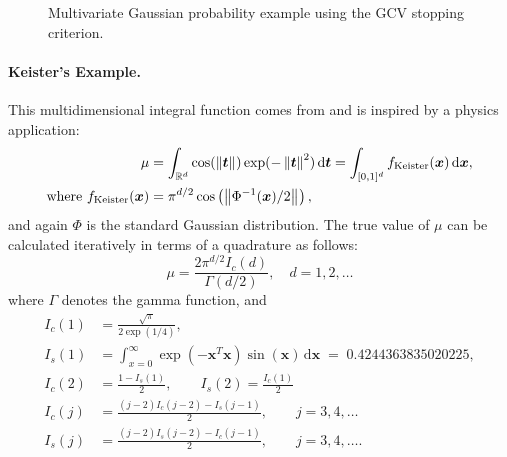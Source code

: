 \documentclass{svjour3}                     %
\newcommand{\bm}[1]{\boldsymbol{#1}}
\newcommand{\dif}[1]{\text{d}{#1}}
\newcommand{\reals}{\mathbb{R}}
\newcommand{\vt}{\bm{t}}
\newcommand{\vx}{\bm{x}}
\newcommand{\dvx}{\dif{\bm{x}}}
\newcommand{\dvt}{\dif{\bm{t}}}
\newcommand{\norm}[2][{}]{\ensuremath{\left \lVert #2 \right \rVert}_{#1}}
\begin{document}
\begin{figure}
	\caption[MVN guaranteed : GCV]{Multivariate Gaussian probability example using the GCV stopping criterion.}
	\label{fig:mvn-guaranteed-GCV}
\end{figure}

\paragraph{Keister's Example.}

This multidimensional integral function comes from \cite{Kei96} and is inspired by a physics application:
\begin{align*}
\mu & =  \int_{\reals^d} \cos(\norm{ \vt}) \exp(-\norm{ \vt }^2) \, \dvt 
 = \int_{[0,1]^d} f_{\textup{Keister}}(\vx) \, \dvx,\\
\text{where } 
f_\textup{Keister}(\vx) &= \pi^{d/2} \cos\left(\norm{ \Phi^{-1}(\vx)/2}\right)  ,
\end{align*}
and again $\Phi$ is the standard Gaussian distribution.
The true value of $\mu$ can be calculated iteratively in terms of a quadrature as follows:  
\begin{equation*}
\mu = \frac{2 \pi^{d/2} I_c(d)}{\Gamma(d/2)}, \quad d=1,2, \ldots
\end{equation*}
where $\Gamma$ denotes the gamma function, and
\begin{align*}
I_c(1) &= \frac{\sqrt{\pi}}{2 \exp(1/4)}, 
\\
I_s(1) &= \int_{x=0}^\infty \exp(-\vx^T\vx)\sin(\vx) \, \dvx 
\; = \;  0.4244363835020225,
\\
I_c(2) &= \frac{1-I_s(1)}{2}, \qquad
I_s(2) = \frac{I_c(1)}{2}
\\
I_c(j) &= \frac{(j-2)I_c(j-2)-I_s(j-1)}{2},
\qquad j =3,4,\ldots
\\
I_s(j) &= \frac{(j-2)I_s(j-2)-I_c(j-1)}{2},
\qquad j =3,4,\ldots.
\end{align*}
\end{document}
